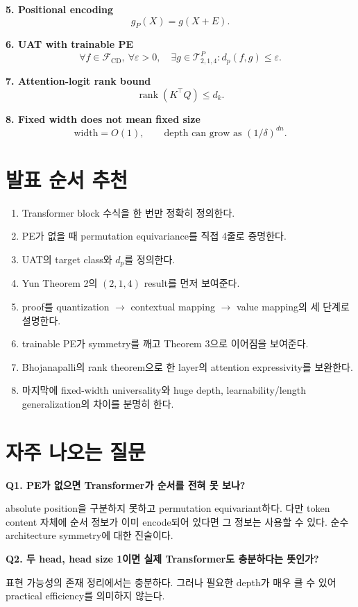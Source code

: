 \documentclass[11pt,a4paper,oneside,openany]{memoir}
\newcommand{\rank}{\operatorname{rank}}
\theoremstyle{definition}
\begin{document}
\textbf{5. Positional encoding}
\[
g_P(X)=g(X+E).
\]

\textbf{6. UAT with trainable PE}
\[
\forall f\in\mathcal F_{\mathrm{CD}},\ \forall\varepsilon>0,
\quad
\exists g\in\mathcal T^P_{2,1,4}:
 d_p(f,g)\le\varepsilon.
\]

\textbf{7. Attention-logit rank bound}
\[
\rank(K^\top Q)\le d_k.
\]

\textbf{8. Fixed width does not mean fixed size}
\[
\text{width}=O(1),
\qquad
\text{depth can grow as }(1/\delta)^{dn}.
\]

\section{발표 순서 추천}

\begin{enumerate}
  \item Transformer block 수식을 한 번만 정확히 정의한다.
  \item PE가 없을 때 permutation equivariance를 직접 4줄로 증명한다.
  \item UAT의 target class와 $d_p$를 정의한다.
  \item Yun Theorem 2의 $(2,1,4)$ result를 먼저 보여준다.
  \item proof를 quantization $\to$ contextual mapping $\to$ value mapping의 세 단계로 설명한다.
  \item trainable PE가 symmetry를 깨고 Theorem 3으로 이어짐을 보여준다.
  \item Bhojanapalli의 rank theorem으로 한 layer의 attention expressivity를 보완한다.
  \item 마지막에 fixed-width universality와 huge depth, learnability/length generalization의 차이를 분명히 한다.
\end{enumerate}

\section{자주 나오는 질문}

\textbf{Q1. PE가 없으면 Transformer가 순서를 전혀 못 보나?}

absolute position을 구분하지 못하고 permutation equivariant하다. 다만 token content 자체에 순서 정보가 이미 encode되어 있다면 그 정보는 사용할 수 있다.
순수 architecture symmetry에 대한 진술이다.

\textbf{Q2. 두 head, head size 1이면 실제 Transformer도 충분하다는 뜻인가?}

표현 가능성의 존재 정리에서는 충분하다. 그러나 필요한 depth가 매우 클 수 있어 practical efficiency를 의미하지 않는다.
\end{document}

